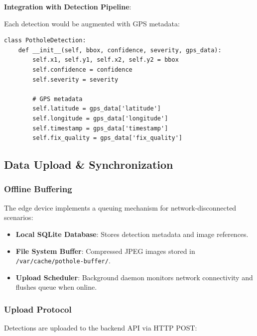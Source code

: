 \documentclass[12pt]{article}
\begin{document}
\textbf{Integration with Detection Pipeline}:

Each detection would be augmented with GPS metadata:

\begin{lstlisting}[caption={Detection with GPS Metadata}, label={lst:detection-gps}]
class PotholeDetection:
    def __init__(self, bbox, confidence, severity, gps_data):
        self.x1, self.y1, self.x2, self.y2 = bbox
        self.confidence = confidence
        self.severity = severity
        
        # GPS metadata
        self.latitude = gps_data['latitude']
        self.longitude = gps_data['longitude']
        self.timestamp = gps_data['timestamp']
        self.fix_quality = gps_data['fix_quality']
\end{lstlisting}

\subsection{Data Upload \& Synchronization}

\subsubsection*{Offline Buffering}

The edge device implements a queuing mechanism for network-disconnected scenarios:

\begin{itemize}
    \item \textbf{Local SQLite Database}: Stores detection metadata and image references.
    \item \textbf{File System Buffer}: Compressed JPEG images stored in \texttt{/var/cache/pothole-buffer/}.
    \item \textbf{Upload Scheduler}: Background daemon monitors network connectivity and flushes queue when online.
\end{itemize}

\subsubsection*{Upload Protocol}

Detections are uploaded to the backend API via HTTP POST:
\end{document}
